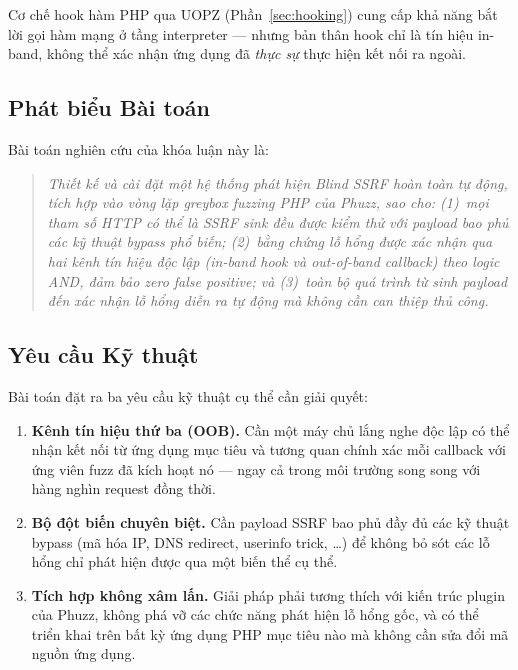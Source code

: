 Cơ chế hook hàm PHP qua UOPZ (Phần~\ref{sec:hooking}) cung cấp khả năng
bắt lời gọi hàm mạng ở tầng interpreter --- nhưng bản thân hook chỉ là
tín hiệu in-band, không thể xác nhận ứng dụng đã \emph{thực sự} thực hiện
kết nối ra ngoài.

\subsection{Phát biểu Bài toán}

Bài toán nghiên cứu của khóa luận này là:

\begin{quote}
\textit{Thiết kế và cài đặt một hệ thống phát hiện Blind SSRF hoàn toàn
tự động, tích hợp vào vòng lặp greybox fuzzing PHP của Phuzz, sao cho:
(1)~mọi tham số HTTP có thể là SSRF sink đều được kiểm thử với payload
bao phủ các kỹ thuật bypass phổ biến; (2)~bằng chứng lỗ hổng được xác
nhận qua hai kênh tín hiệu độc lập (in-band hook và out-of-band callback)
theo logic AND, đảm bảo zero false positive; và (3)~toàn bộ quá trình từ
sinh payload đến xác nhận lỗ hổng diễn ra tự động mà không cần can thiệp
thủ công.}
\end{quote}

\subsection{Yêu cầu Kỹ thuật}

Bài toán đặt ra ba yêu cầu kỹ thuật cụ thể cần giải quyết:

\begin{enumerate}
    \item \textbf{Kênh tín hiệu thứ ba (OOB).} Cần một máy chủ lắng nghe
    độc lập có thể nhận kết nối từ ứng dụng mục tiêu và tương quan chính
    xác mỗi callback với ứng viên fuzz đã kích hoạt nó --- ngay cả trong
    môi trường song song với hàng nghìn request đồng thời.
    \item \textbf{Bộ đột biến chuyên biệt.} Cần payload SSRF bao phủ đầy
    đủ các kỹ thuật bypass (mã hóa IP, DNS redirect, userinfo trick, \ldots)
    để không bỏ sót các lỗ hổng chỉ phát hiện được qua một biến thể cụ thể.
    \item \textbf{Tích hợp không xâm lấn.} Giải pháp phải tương thích với
    kiến trúc plugin của Phuzz, không phá vỡ các chức năng phát hiện lỗ
    hổng gốc, và có thể triển khai trên bất kỳ ứng dụng PHP mục tiêu nào
    mà không cần sửa đổi mã nguồn ứng dụng.
\end{enumerate}


